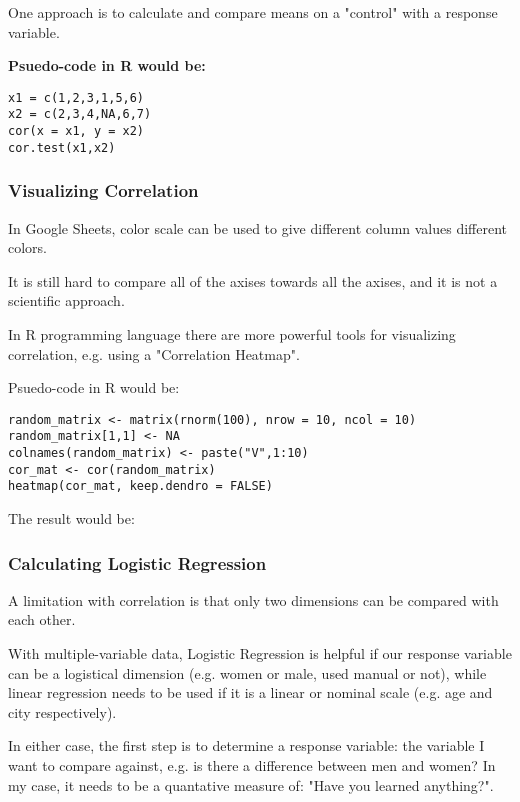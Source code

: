 One approach is to calculate and compare means on a "control"  with a response variable.

\textbf{Psuedo-code in R would be: }

\begin{verbatim}
x1 = c(1,2,3,1,5,6)
x2 = c(2,3,4,NA,6,7)
cor(x = x1, y = x2)
cor.test(x1,x2)
\end{verbatim}

\subsubsection{Visualizing Correlation}

In Google Sheets, color scale can be used to give different column values different colors.

It is still hard to compare all of the axises towards all the axises, and it is not a scientific approach.


In R programming language there are more powerful tools for visualizing correlation, e.g. using a "Correlation Heatmap".

Psuedo-code in R would be:

\begin{verbatim}
random_matrix <- matrix(rnorm(100), nrow = 10, ncol = 10)
random_matrix[1,1] <- NA
colnames(random_matrix) <- paste("V",1:10)
cor_mat <- cor(random_matrix)
heatmap(cor_mat, keep.dendro = FALSE)
\end{verbatim}

The result would be:


\subsubsection{Calculating Logistic Regression}

A limitation with correlation is that only two dimensions can be compared with each other.

With multiple-variable data, Logistic Regression is helpful if our response variable can be a logistical dimension (e.g. women or male, used manual or not), while linear regression needs to be used if it is a linear or nominal scale (e.g. age and city respectively).

In either case, the first step is to determine a response variable: the variable I want to compare against, e.g. is there a difference between men and women? In my case, it needs to be a quantative measure of: "Have you learned anything?".

